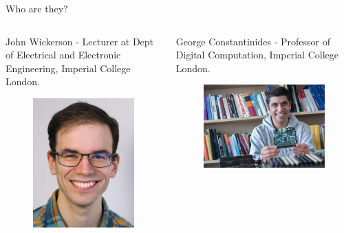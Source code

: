 \documentclass[notes xcolor=dvipsnames]{beamer}
\begin{document}
\begin{frame}{Who are they?}
\begin{columns}
            \begin{column}[]{0.3\textwidth}
                John Wickerson - Lecturer at Dept of Electrical and Electronic Engineering, Imperial College London.
                \begin{figure}
                    \includegraphics[scale=0.2]{john.jpg}
                \end{figure}
                
            \end{column}

            \begin{column}[]{0.3\textwidth}
                George Constantinides - Professor of Digital Computation, Imperial College London.
                \begin{figure}
                    \includegraphics[scale=0.2]{Constantinides.jpg}
                \end{figure}
                

\end{column}
\end{columns}
\end{frame}
\end{document}
